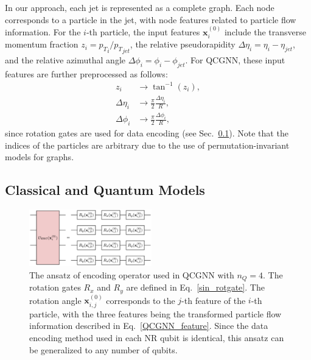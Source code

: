 \documentclass[reprint,amsmath,amssymb,prd,nofootinbib]{revtex4-2}
\def\xbf{\mathbf{x}}
\begin{document}
In our approach, each jet is represented as a complete graph. Each node corresponds to a particle in the jet, with node features related to particle flow information. For the $i$-th particle, the input features $\xbf^{(0)}_i$ include the transverse momentum fraction $z_i={p_T}_i/{p_T}_{jet}$, the relative pseudorapidity $\Delta\eta_i=\eta_i-\eta_{jet}$, and the relative azimuthal angle $\Delta\phi_i=\phi_i-\phi_{jet}$. For QCGNN, these input features are further preprocessed as follows:
\begin{equation} \label{QCGNN_feature}
    \begin{split}
        z_i &\longrightarrow \tan^{-1}(z_i), \\
        \Delta\eta_i &\longrightarrow \frac{\pi}{2}\frac{\Delta\eta_i}{R}, \\
        \Delta\phi_i &\longrightarrow \frac{\pi}{2}\frac{\Delta\phi_i}{R},
    \end{split}
\end{equation}
since rotation gates are used for data encoding (see Sec.~\ref{sec_cq_model_setup}). Note that the indices of the particles are arbitrary due to the use of permutation-invariant models for graphs.

\subsection{Classical and Quantum Models} \label{sec_cq_model_setup}

\begin{figure}[htbp]
    \centering
    \includegraphics[width=0.475\textwidth]{fig_qc_enc.png}
    \caption{The ansatz of encoding operator used in QCGNN with $n_Q=4$. The rotation gates $R_x$ and $R_y$ are defined in Eq.~\ref{sin_rotgate}. The rotation angle $\xbf^{(0)}_{i,j}$ corresponds to the $j$-th feature of the $i$-th particle, with the three features being the transformed particle flow information described in Eq.~\ref{QCGNN_feature}. Since the data encoding method used in each NR qubit is identical, this ansatz can be generalized to any number of qubits.}
    \label{fig:exenc}
\end{figure}
\end{document}
